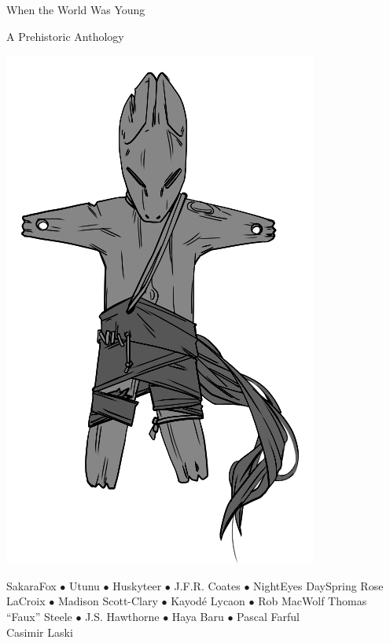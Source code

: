 \documentclass[11pt]{memoir}
\begin{document}
  \frontmatter
  \pagestyle{empty}


  \begin{flushright}
  \null
  \vfill
  \large{}
  
  \vfill
  \end{flushright}

  \cleardoublepage
  \doublespacing

  \begin{center}
    \TitleFamily
    \Huge{When the World Was Young}

    \vfill

    \large{ A Prehistoric Anthology}
    
    \vfill

    \includegraphics{assets/toy-bw.png}
    
    \vfill
  
    \normalfont\small
    SakaraFox $\bullet$
    Utunu $\bullet$
    Huskyteer $\bullet$
    J.F.R. Coates $\bullet$
    NightEyes DaySpring %
    Rose LaCroix $\bullet$
    Madison Scott-Clary $\bullet$
    Kayodé Lycaon $\bullet$
    Rob MacWolf %
    Thomas ``Faux'' Steele $\bullet$
    J.S. Hawthorne $\bullet$
    Haya Baru $\bullet$
    Pascal Farful \\%
    Casimir Laski %
  \end{center}
  \thispagestyle{empty}
\end{document}

